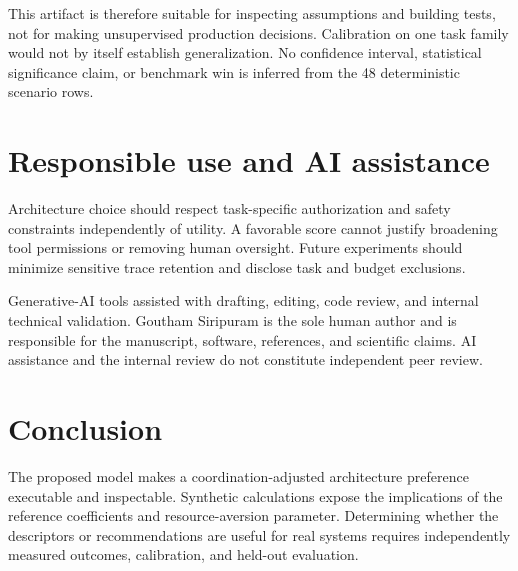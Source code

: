 \documentclass[11pt]{article}
\begin{document}
This artifact is therefore suitable for inspecting assumptions and building tests, not for making unsupervised production decisions. Calibration on one task family would not by itself establish generalization. No confidence interval, statistical significance claim, or benchmark win is inferred from the 48 deterministic scenario rows.

\section{Responsible use and AI assistance}
Architecture choice should respect task-specific authorization and safety constraints independently of utility. A favorable score cannot justify broadening tool permissions or removing human oversight. Future experiments should minimize sensitive trace retention and disclose task and budget exclusions.

Generative-AI tools assisted with drafting, editing, code review, and internal technical validation. Goutham Siripuram is the sole human author and is responsible for the manuscript, software, references, and scientific claims. AI assistance and the internal review do not constitute independent peer review.

\section{Conclusion}
The proposed model makes a coordination-adjusted architecture preference executable and inspectable. Synthetic calculations expose the implications of the reference coefficients and resource-aversion parameter. Determining whether the descriptors or recommendations are useful for real systems requires independently measured outcomes, calibration, and held-out evaluation.
\begingroup\small\sloppy\endgroup
\end{document}
